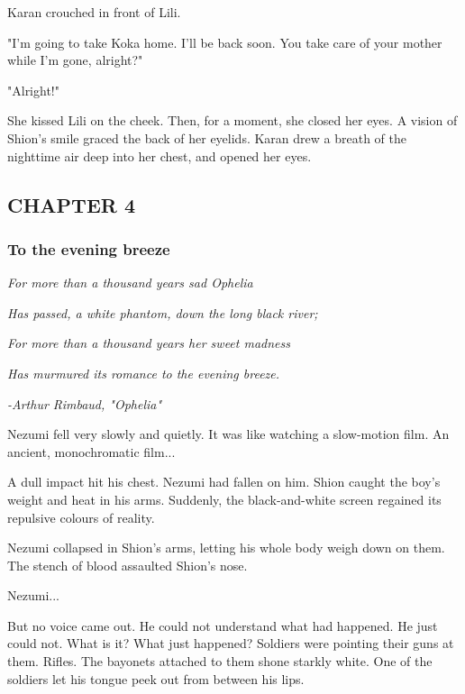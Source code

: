 Karan crouched in front of Lili.

"I'm going to take Koka home. I'll be back soon. You take care of your
mother while I'm gone, alright?"

"Alright!"

She kissed Lili on the cheek. Then, for a moment, she closed her eyes. A
vision of Shion's smile graced the back of her eyelids. Karan drew a
breath of the nighttime air deep into her chest, and opened her eyes.

\hypertarget{index_split_067.htmlux5cux23calibre_pb_98}{}

\protect\hypertarget{index_split_096.html}{}{}

\hypertarget{index_split_096.htmlux5cux23calibre_pb_0}{}

\hypertarget{index_split_096.htmlux5cux23calibre_toc_5}{%
\subsection{CHAPTER 4}\label{index_split_096.htmlux5cux23calibre_toc_5}}

\subsubsection{To the evening breeze}

\emph{For more than a thousand years sad Ophelia}

\emph{Has passed, a white phantom, down the long black river;}

\emph{For more than a thousand years her sweet madness}

\emph{Has murmured its romance to the evening breeze.}

\emph{-Arthur Rimbaud, "Ophelia"}

Nezumi fell very slowly and quietly. It was like watching a slow-motion
film. An ancient, monochromatic film...

A dull impact hit his chest. Nezumi had fallen on him. Shion caught the
boy's weight and heat in his arms. Suddenly, the black-and-white screen
regained its repulsive colours of reality.

Nezumi collapsed in Shion's arms, letting his whole body weigh down on
them. The stench of blood assaulted Shion's nose.

Nezumi...

But no voice came out. He could not understand what had happened. He
just could not. What is it? What just happened? Soldiers were pointing
their guns at them. Rifles. The bayonets attached to them shone starkly
white. One of the soldiers let his tongue peek out from between his
lips.

